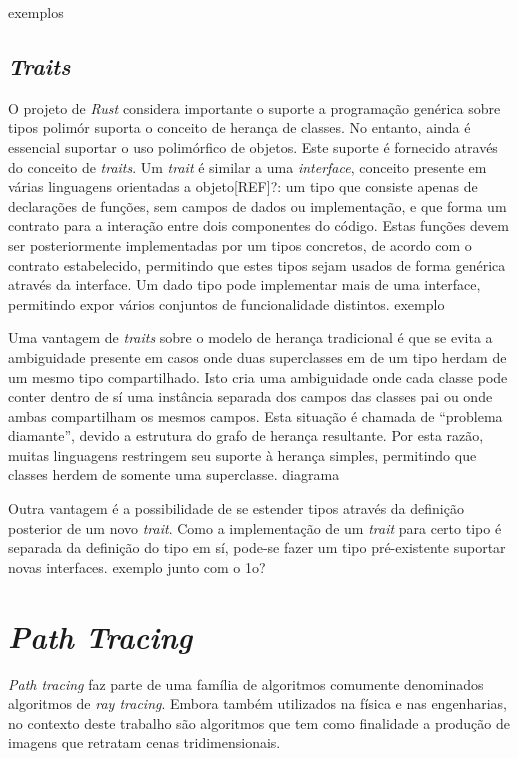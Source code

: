 \documentclass[tg]{mdtufsm}
\newcommand{\todo}[1]{\textsf{\color{red}#1}}
\begin{document}
\todo{exemplos}

\subsection{\emph{Traits}}

O projeto de \emph{Rust} considera importante o suporte a programação genérica sobre tipos polimór suporta o conceito de herança de classes. No entanto, ainda é essencial suportar o uso polimórfico de objetos. Este suporte é fornecido através do conceito de \emph{traits}. Um \emph{trait} é similar a uma \emph{interface}, conceito presente em várias linguagens orientadas a objeto\todo{[REF]?}: um tipo que consiste apenas de declarações de funções, sem campos de dados ou implementação, e que forma um contrato para a interação entre dois componentes do código. Estas funções devem ser posteriormente implementadas por um tipos concretos, de acordo com o contrato estabelecido, permitindo que estes tipos sejam usados de forma genérica através da interface. Um dado tipo pode implementar mais de uma interface, permitindo expor vários conjuntos de funcionalidade distintos. \todo {exemplo}

Uma vantagem de \emph{traits} sobre o modelo de herança tradicional é que se evita a ambiguidade presente em casos onde duas superclasses em de um tipo herdam de um mesmo tipo compartilhado. Isto cria uma ambiguidade onde cada classe pode conter dentro de sí uma instância separada dos campos das classes pai ou onde ambas compartilham os mesmos campos. Esta situação é chamada de ``problema diamante'', devido a estrutura do grafo de herança resultante. Por esta razão, muitas linguagens restringem seu suporte à herança simples, permitindo que classes herdem de somente uma superclasse. \todo{diagrama}

Outra vantagem é a possibilidade de se estender tipos através da definição posterior de um novo \emph{trait}. Como a implementação de um \emph{trait} para certo tipo é separada da definição do tipo em sí, pode-se fazer um tipo pré-existente suportar novas interfaces. \todo{exemplo junto com o 1o?}

\section{\emph{Path Tracing}}

\emph{Path tracing} faz parte de uma família de algoritmos comumente denominados algoritmos de
\emph{ray tracing}. Embora também utilizados na física e nas engenharias, no contexto deste trabalho
são algoritmos que tem como finalidade a produção de imagens que retratam cenas tridimensionais.
\end{document}

